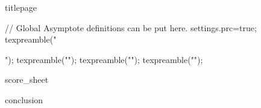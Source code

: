 \documentclass[a4paper,12pt]{article}
\begin{document}
{titlepage}
\clearpage
  \setcounter{page}{2}
  \tableofcontents
\clearpage


\begin{asydef}
// Global Asymptote definitions can be put here.
settings.prc=true;
texpreamble("\usepackage{xltxtra,unicode-math}");
texpreamble("\setmainfont{Times New Roman}");
texpreamble("\setsansfont{Arial}\setmonofont{Courier New}");
texpreamble("");
\end{asydef}

\clearpage
  {score_sheet}
\clearpage

\clearpage
  {conclusion}
\clearpage
\end{document}
